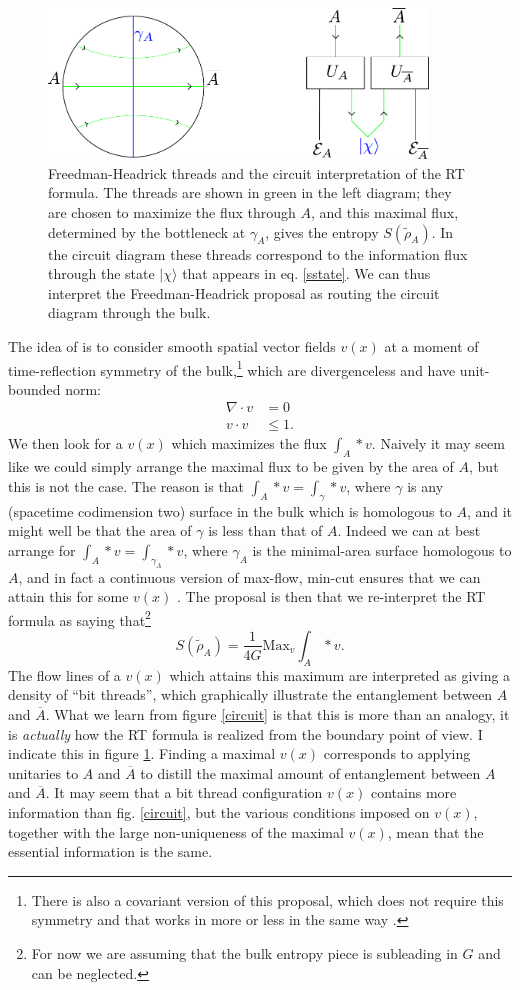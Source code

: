 \documentclass[12pt]{article}
\newcommand{\be}{\begin{equation}}
\newcommand{\ee}{\end{equation}}
\newcommand{\bfig}{\begin{figure}\begin{center}}
\newcommand{\efig}{\end{center}\end{figure}}
\newcommand{\ran}{\rangle}
\newcommand{\wt}{\widetilde}
\newcommand{\Ab}{\ol{A}}
\newcommand{\ol}{\overline}
\begin{document}
\bfig
\includegraphics[height=4cm]{threads.pdf}
\caption{Freedman-Headrick threads and the circuit interpretation of the RT formula.  The threads are shown in green in the left diagram; they are chosen to maximize the flux through $A$, and this maximal flux, determined by the bottleneck at $\gamma_A$, gives the entropy $S(\wt{\rho}_A)$.  In the circuit diagram these threads correspond to the information flux through the state $|\chi\ran$ that appears in eq. \eqref{sstate}.  We can thus interpret the Freedman-Headrick proposal as routing the circuit diagram through the bulk.}\label{threads}
\efig
The idea of \cite{Freedman:2016zud} is to consider smooth spatial vector fields $v(x)$ at a moment of time-reflection symmetry of the bulk,\footnote{There is also a covariant version of this proposal, which does not require this symmetry and that works in more or less in the same way \cite{headrickhubeny}.} which are divergenceless and have unit-bounded norm:
\begin{align}
\nabla\cdot v&=0\\
v\cdot v&\leq 1.
\end{align}
We then look for a $v(x)$ which maximizes the flux $\int_A *v$.  Naively it may seem like we could simply arrange the maximal flux to be given by the area of $A$, but this is not the case.  The reason is that $\int_A *v=\int_\gamma *v$, where $\gamma$ is any (spacetime codimension two) surface in the bulk which is homologous to $A$, and it might well be that the area of $\gamma$ is less than that of $A$.  Indeed we can at best arrange for $\int_A *v=\int_{\gamma_A}*v$, where $\gamma_A$ is the minimal-area surface homologous to $A$, and in fact a continuous version of max-flow, min-cut ensures that we can attain this for some $v(x)$ \cite{Freedman:2016zud}.  The proposal is then that we re-interpret the RT formula as saying that\footnote{For now we are assuming that the bulk entropy piece is subleading in $G$ and can be neglected.}
\be
S(\wt{\rho}_A)=\frac{1}{4G}\mathrm{Max}_v \int_A *v.
\ee
The flow lines of a $v(x)$ which attains this maximum are interpreted as giving a density of ``bit threads'', which graphically illustrate the entanglement between $A$ and $\Ab$.  What we learn from figure \ref{circuit} is that this is more than an analogy, it is \textit{actually} how the RT formula is realized from the boundary point of view. I indicate this in figure \ref{threads}. Finding a maximal $v(x)$ corresponds to applying unitaries to $A$ and $\Ab$ to distill the maximal amount of entanglement between $A$ and $\Ab$.  It may seem that a bit thread configuration $v(x)$ contains more information than fig. \ref{circuit}, but the various conditions imposed on $v(x)$, together with the large non-uniqueness of the maximal $v(x)$, mean that the essential information is the same.  
\end{document}
